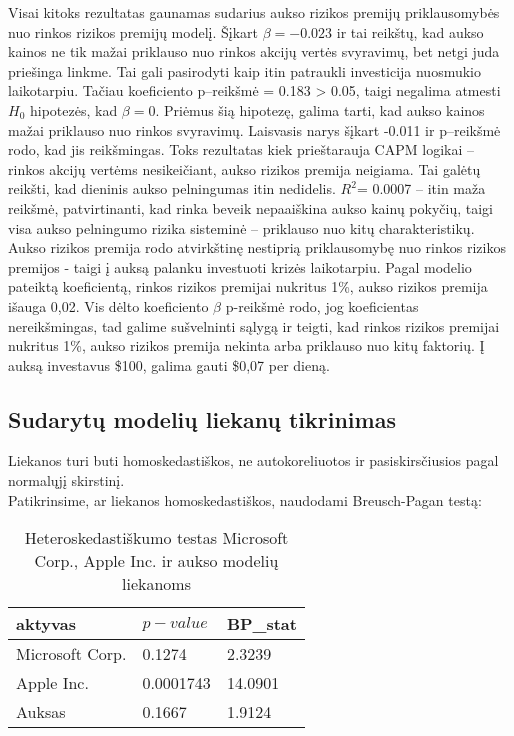 \documentclass[12pt, a14paper, lithuanian]{article}
\begin{document}
Visai kitoks rezultatas gaunamas sudarius aukso rizikos premijų priklausomybės nuo rinkos rizikos premijų modelį.
Šįkart $\beta=-0.023$ ir tai reikštų, kad aukso kainos ne tik mažai priklauso nuo rinkos akcijų vertės svyravimų,
bet netgi juda priešinga linkme. Tai gali pasirodyti kaip itin patraukli investicija nuosmukio laikotarpiu.
Tačiau koeficiento p--reikšmė = 0.183 > 0.05, taigi negalima atmesti $ H_0 $ hipotezės, kad $\beta=0 $.
Priėmus šią hipotezę, galima tarti, kad aukso kainos mažai priklauso nuo rinkos svyravimų.
Laisvasis narys šįkart -0.011 ir p--reikšmė rodo, kad jis reikšmingas. Toks rezultatas kiek prieštarauja CAPM logikai -- rinkos akcijų vertėms nesikeičiant, aukso rizikos premija neigiama. Tai galėtų reikšti,
kad dieninis aukso pelningumas itin nedidelis.
$ R^2 $= 0.0007 -- itin maža reikšmė, patvirtinanti, kad rinka beveik nepaaiškina aukso kainų pokyčių, taigi 
visa aukso pelningumo rizika sisteminė -- priklauso nuo kitų charakteristikų. \\


Aukso rizikos premija rodo atvirkštinę nestiprią priklausomybę nuo rinkos rizikos premijos - taigi į auksą palanku investuoti krizės laikotarpiu. Pagal modelio pateiktą koeficientą, rinkos rizikos premijai nukritus 1\%, aukso rizikos premija išauga 0,02. Vis dėlto koeficiento $\beta$ p-reikšmė rodo, jog koeficientas nereikšmingas, tad galime sušvelninti sąlygą ir teigti, kad rinkos rizikos premijai nukritus 1\%, aukso rizikos premija nekinta arba priklauso nuo kitų faktorių. Į auksą investavus \$100, galima gauti \$0,07 per dieną.



\subsection{Sudarytų modelių liekanų tikrinimas}

Liekanos turi buti homoskedastiškos, ne autokoreliuotos ir pasiskirsčiusios pagal normalųjį skirstinį. \\

Patikrinsime, ar liekanos homoskedastiškos, naudodami Breusch-Pagan testą:

\begin{table}[ht]
\begin{center}
    \begin{tabular}{ | l | l | l |}
    \hline
    aktyvas  & $ p-value $ & BP_{stat} \\
    \hline
  Microsoft Corp. & 0.1274 & 2.3239\\
	Apple Inc. & 0.0001743 & 14.0901\\
	Auksas &  0.1667 & 1.9124\\
	\hline
    \end{tabular}
\end{center}
\caption{Heteroskedastiškumo testas Microsoft Corp., Apple Inc. ir aukso modelių liekanoms}
\end{table}
\end{document}
